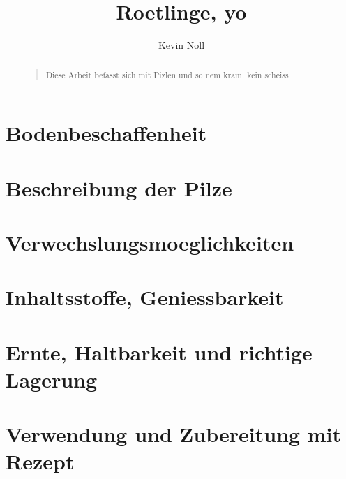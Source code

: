 \documentclass[a4paper,abstracton]{scrreprt}
\begin{document}
\author{Kevin Noll}
\subject{Pilze und so}
\title{Roetlinge, yo}
\publishers{htwsaar}
\maketitle
\tableofcontents

\begin{abstract}
\begin{quote}%
Diese Arbeit befasst sich mit Pizlen und so nem kram. kein scheiss
\end{quote} 
\end{abstract}

\chapter{Bodenbeschaffenheit}
\chapter{Beschreibung der Pilze}
\chapter{Verwechslungsmoeglichkeiten}
\chapter{Inhaltsstoffe, Geniessbarkeit}
\chapter{Ernte, Haltbarkeit und richtige Lagerung}
\chapter{Verwendung und Zubereitung mit Rezept}

\end{document}
